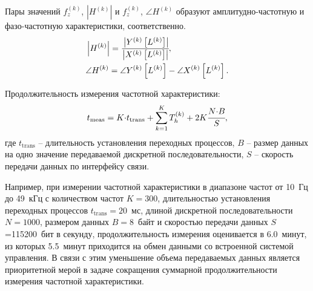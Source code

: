 Пары значений ${f^{(k)}_{z}}$, ${\left| H^{(k)} \right|}$ и ${f^{(k)}_{z}}$, ${\angle H^{(k)}}$ образуют амплитудно-частотную и фазо-частотную характеристики, соответственно.
\begin{equation}\label{eqn:abs_angleFreqResp}
    \begin{aligned}
        &\left| H^{(k)} \right| = \cfrac{\left| Y^{(k)}\left[L^{(k)}\right] \right| }{ \left| X^{(k)}\left[L^{(k)}\right] \right|}, \\
        &\angle H^{(k)} = \angle Y^{(k)}\left[L^{(k)}\right] - \angle X^{(k)}\left[L^{(k)}\right].
    \end{aligned}
\end{equation}

Продолжительность измерения частотной характеристики:
\begin{equation}\label{eqn:meas_duration}
    t_\text{meas} = K \mathord{\cdot} t_\text{trans} + \sum_{k=1}^{K} {T^{(k)}_h} + 2 K \cfrac{N \mathord{\cdot} B}{S},
\end{equation}
где ${t_\text{trans}}$ -- длительность установления переходных процессов, $B$ -- размер данных на одно значение передаваемой дискретной последовательности, $S$ -- скорость передачи данных по интерфейсу связи.

Например, при измерении частотной характеристики в диапазоне частот от 10~Гц до 49~кГц с количеством частот ${K=300}$, длительностью установления переходных процессов ${t_\text{trans}=20}$~мс, длиной дискретной последовательности ${N=1000}$, размером данных ${B=8}$~байт и скоростью передачи данных $S$=\num{115200}~бит в секунду, продолжительность измерения оценивается в \num{6.0}~минут, из которых \num{5.5}~минут приходится на обмен данными со встроенной системой управления. В связи с этим уменьшение объема передаваемых данных является приоритетной мерой в задаче сокращения суммарной продолжительности измерения частотной характеристики.







